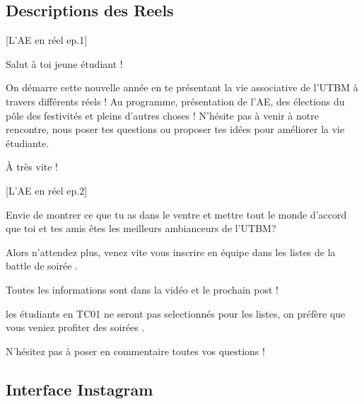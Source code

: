 


\subsection*{Descriptions des Reels}\label{subsec:descriptions-reels}



[L'AE en réel ep.1]

\noindent Salut à toi jeune étudiant !

\noindent On démarre cette nouvelle année en te présentant la vie associative de l'UTBM à travers différents réels !
\noindent Au programme, présentation de l'AE, des élections du pôle des festivités et pleins d'autres choses !
\noindent N'hésite pas à venir à notre rencontre, nous poser tes questions ou proposer tes idées pour améliorer la vie étudiante.

\noindent À très vite !


[L'AE en réel ep.2]

\noindent Envie de montrer ce que tu as dans le ventre et mettre tout le monde d'accord que toi et tes amis êtes les meilleurs ambianceurs de l'UTBM? 

\noindent Alors n'attendez plus, venez vite vous inscrire en équipe dans les listes de la battle de soirée .

\noindent Toutes les informations sont dans la vidéo et le prochain post  !

\noindent {} les étudiants en TC01 ne seront pas selectionnés pour les listes, on préfère que vous veniez profiter des soirées .

\noindent N'hésitez pas à poser en commentaire toutes vos questions !


\subsection*{Interface Instagram}\label{subsec:interface-instagram}

